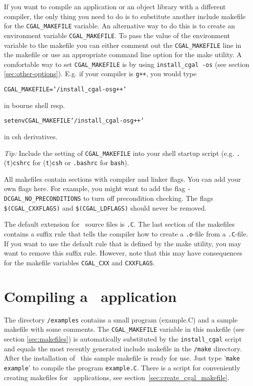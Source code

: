 If you want to compile an application or an object library with a
different compiler, the only thing you need to do is to substitute
another include makefile for the \texttt{CGAL\_MAKEFILE} variable. An
alternative way to do this is to create an environment variable
\texttt{CGAL\_MAKEFILE}. To pass the value of the environment variable
to the makefile you can either comment out the \texttt{CGAL\_MAKEFILE}
line in the makefile or use an appropriate command line option for the
make utility.  A comfortable way to set \texttt{CGAL\_MAKEFILE} is by
using \texttt{install\_cgal~-os} (see section
\ref{sec:other-options}).  E.g. if your compiler is \texttt{g++}, you
would type
\begin{alltt}
CGAL_MAKEFILE=`\yourcgaldir/install_cgal -os g++`
\end{alltt}
in bourne shell resp.
\begin{alltt}
setenv CGAL_MAKEFILE `\yourcgaldir/install_cgal -os g++`
\end{alltt}
in csh derivatives. 

\textit{Tip:} Include the setting of \texttt{CGAL\_MAKEFILE} into your
shell startup script (e.g. \texttt{.}(\texttt{t})\texttt{cshrc} for
(\texttt{t})\texttt{csh} or \texttt{.bashrc} for \texttt{bash}).

All makefiles contain sections with compiler and linker flags.  You
can add your own flags here. For example, you might want to add the
flag \texttt{-DCGAL\_NO\_PRECONDITIONS} to turn off precondition
checking. The flags \texttt{\$(CGAL\_CXXFLAGS)} and
\texttt{\$(CGAL\_LDFLAGS)} should never be removed.

The default extension for \cgal\ source files is \texttt{.C}.  The
last section of the makefiles contains a suffix rule that tells the
compiler how to create a \texttt{.o}-file from a \texttt{.C}-file.  If
you want to use the default rule that is defined by the make utility,
you may want to remove this suffix rule.  However, note that this may
have consequences for the makefile variables \texttt{CGAL\_CXX} and
\texttt{CXXFLAGS}.

\section{Compiling a \cgal\ application}

The directory \texttt{\cgaldir/examples} contains a small program
(example.C) and a sample makefile with some comments. The
\texttt{CGAL\_MAKEFILE} variable in this makefile (see section
\ref{sec:makefiles}) is automatically substituted by the
\texttt{install\_cgal} script and equals the most recently generated
include makefile in the \texttt{\cgaldir/make} directory. After the
installation of \cgal\ this sample makefile is ready for use. Just
type '\texttt{make example}' to compile the program
\texttt{example.C}. There is a script for conveniently creating
makefiles for \cgal\ applications, see
section~\ref{sec:create_cgal_makefile}.

